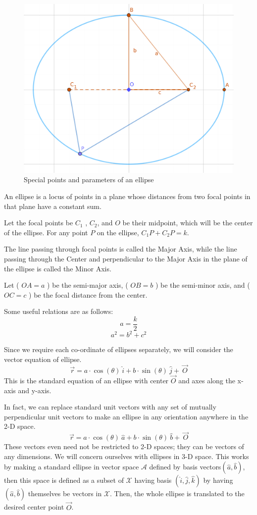 \documentclass[a4paper]{article}
\begin{document}
\begin{figure}[h]
    \centering
    \includegraphics[width=0.75\linewidth]{Images/Ellipse.png}
    \caption{Special points and parameters of an ellipse}
    \label{fig:enter-label}
\end{figure}
An ellipse is a locus of points in a plane whose distances from two focal points in that plane have a constant sum.

Let the focal points be \(C_{1}\) , \( C_{2}\), and \(O\) be their midpoint, which will be the center of the ellipse. For any point \(P\) on the ellipse, \(C_{1}P + C_{2}P = k\).

The line passing through focal points is called the Major Axis, while the line passing through the Center and perpendicular to the Major Axis in the plane of the ellipse is called the Minor Axis.

Let ( \(OA = a\) ) be the semi-major axis, ( \(OB = b\) ) be the semi-minor axis, and ( \(OC = c\) ) be the focal distance from the center.

Some useful relations are as follows:
\[a = \frac{k}{2}\]
\[a^{2} = b^{2} + c^{2}\]

Since we require each co-ordinate of ellipses separately, we will consider the vector equation of ellipse.
\[\vec{r} = a \cdot \cos(\theta)\ \hat{i} + b \cdot \sin(\theta)\ \hat{j} + \ \Vec{O}\]
This is the standard equation of an ellipse with center \(\vec{O}\) and axes along the x-axis and y-axis.

In fact, we can replace standard unit vectors with any set of mutually perpendicular unit vectors to make an ellipse in any orientation anywhere in the 2-D space.
\[\vec{r} = a \cdot \cos(\theta)\ \hat{a} + b \cdot \sin(\theta)\ \hat{b} + \ \Vec{O}\]
These vectors even need not be restricted to 2-D spaces; they can be vectors of any dimensions. We will concern ourselves with ellipses in 3-D space. This works by making a standard ellipse in vector space \(\mathcal{A}\) defined by basis vectors\((\hat{a} , \hat{b} )\), then this space is defined as a subset of \(\mathcal{X}\) having basis \((\hat{i} , \hat{j} , \hat{k} )\) by having \((\hat{a} , \hat{b} )\) themselves be vectors in \(\mathcal{X}\). Then, the whole ellipse is translated to the desired center point \(\vec{O}\). 
\end{document}

